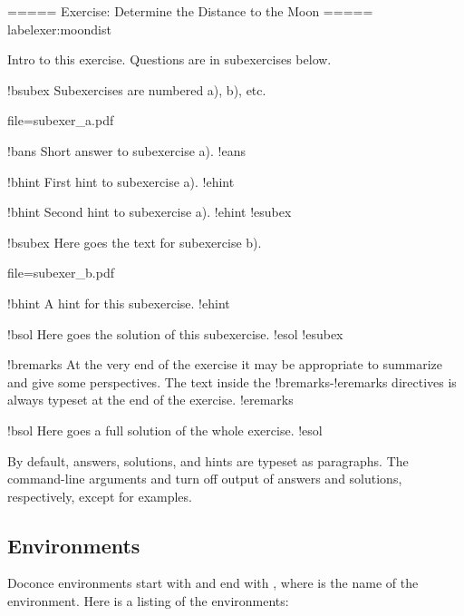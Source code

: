 \documentclass[%
oneside,                 %
final,                   %
10pt]{article}
\begin{document}
\bccq
===== Exercise: Determine the Distance to the Moon =====
label{exer:moondist}

Intro to this exercise. Questions are in subexercises below.

!bsubex
Subexercises are numbered a), b), etc.

file=subexer_a.pdf

!bans
Short answer to subexercise a).
!eans

!bhint
First hint to subexercise a).
!ehint

!bhint
Second hint to subexercise a).
!ehint
!esubex

!bsubex
Here goes the text for subexercise b).

file=subexer_b.pdf

!bhint
A hint for this subexercise.
!ehint

!bsol
Here goes the solution of this subexercise.
!esol
!esubex

!bremarks
At the very end of the exercise it may be appropriate to summarize
and give some perspectives. The text inside the !bremarks-!eremarks
directives is always typeset at the end of the exercise.
!eremarks

!bsol
Here goes a full solution of the whole exercise.
!esol

\eccq
By default, answers, solutions, and hints are typeset as paragraphs.
The command-line arguments  and 
turn off output of answers and solutions, respectively, except for
examples.


\subsection{Environments}

Doconce environments start with  and end with ,
where  is the name of the environment. Here is a listing of
the environments:
\end{document}
